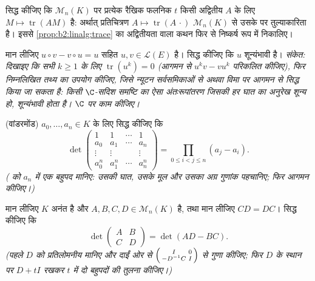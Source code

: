 \begin{exercise}[$\star\star\star$]\label{exo:b2:linalg:9}
सिद्ध कीजिए कि $\mathcal{M}_n(K)$ पर प्रत्येक रैखिक फलनिक $t$ किसी अद्वितीय $A$ के
लिए $M \mapsto
\operatorname{tr}(AM)$ है: अर्थात् प्रतिचित्रण $A \mapsto
\operatorname{tr}(A\,\cdot)$ $\mathcal{M}_n(K)$ से उसके  पर तुल्याकारिता
है। इससे \cref{prop:b2:linalg:trace} का अद्वितीयता वाला कथन फिर से निष्कर्ष रूप में निकालिए।
\end{exercise}

\begin{exercise}[$\star\star\star$]\label{exo:b2:linalg:10}
मान लीजिए $u \circ v - v \circ u = u$ सहित $u, v \in \mathcal{L}(E)$ है। सिद्ध कीजिए कि $u$ शून्यंभावी है।
\emph{संकेत: दिखाइए कि सभी $k \geq 1$ के लिए $\operatorname{tr}(u^k) = 0$ (आगमन से $u^k v -
v u^k$ परिकलित कीजिए),
फिर निम्नलिखित तथ्य का उपयोग कीजिए, जिसे न्यूटन सर्वसमिकाओं से अथवा
विमा पर आगमन से सिद्ध किया जा सकता है: किसी $\C$-सदिश समष्टि का ऐसा
अंतःरूपांतरण जिसकी हर घात का अनुरेख शून्य हो, शून्यंभावी होता है। $\C$
पर काम कीजिए।}
\end{exercise}

\begin{exercise}[$\star\star$]\label{exo:b2:linalg:11}
(वांडरमोंड) $a_0, \dots, a_n \in K$ के लिए सिद्ध कीजिए कि
\[
\det\begin{pmatrix}
1 & 1 & \cdots & 1\\
a_0 & a_1 & \cdots & a_n\\
\vdots & \vdots & & \vdots\\
a_0^n & a_1^n & \cdots & a_n^n
\end{pmatrix}
= \prod_{0 \leq i < j \leq n} (a_j - a_i).
\]
\emph{( को $a_n$ में एक बहुपद मानिए: उसकी घात, उसके मूल और उसका
अग्र गुणांक पहचानिए; फिर आगमन कीजिए।)}
\end{exercise}

\begin{exercise}[$\star\star\star$]\label{exo:b2:linalg:12}
मान लीजिए $K$ अनंत है और $A, B, C, D \in \mathcal{M}_n(K)$ है, तथा मान लीजिए $CD = DC$। सिद्ध कीजिए कि
\[
\det\begin{pmatrix} A & B\\ C & D\end{pmatrix}
= \det(AD - BC).
\]
\emph{(पहले $D$ को प्रतिलोमनीय मानिए और दाईं ओर से $\begin{psmallmatrix} I & 0\\ -D^{-1}C & I\end{psmallmatrix}$ से गुणा कीजिए;
फिर $D$ के स्थान पर $D + tI$ रखकर $t$ में दो बहुपदों की तुलना कीजिए।)}
\end{exercise}

